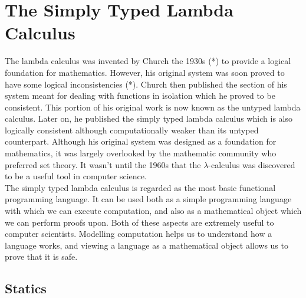 \chapter{The Simply Typed Lambda Calculus}
\label{chap: stlc}

The lambda calculus was invented by Church the 1930s (*) to provide a logical foundation for 
mathematics. However, his original system was soon proved to have some logical inconsistencies (*). 
Church then published the section of his system meant for dealing with functions in isolation 
which he proved to be consistent. This portion of his original work is now known as the untyped 
lambda calculus. Later on, he published the simply typed lambda calculus \cite{church1940} which is also logically 
consistent although computationally weaker than its untyped counterpart. Although his original 
system was designed as a foundation for mathematics, it was largely overlooked by the mathematic 
community who preferred set theory. It wasn't until the 1960s that the $\lambda$-calculus was 
discovered to be a useful tool in computer science. \\

\noindent
The simply typed lambda calculus is regarded as the most basic functional programming language. 
It can be used both as a simple programming language with which we can execute computation, and 
also as a mathematical object which we can perform proofs upon. Both of these aspects are 
extremely useful to computer scientists. Modelling computation helps us to understand how a 
language works, and viewing a language as a mathematical object allows us to prove that it 
is safe. 

\section{Statics}

